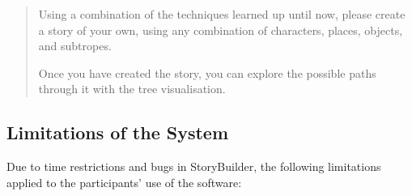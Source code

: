\documentclass[11pt]{report}
\begin{document}
\begin{framed}
\begin{quote}
Using a combination of the techniques learned up until now, please create a story of your own, using any combination of characters, places, objects, and subtropes.

Once you have created the story, you can explore the possible paths through it with the tree visualisation.
\end{quote}
\end{framed}

\subsection{Limitations of the System}
\label{sec:limitations}

Due to time restrictions and bugs in StoryBuilder, the following limitations
applied to the participants' use of the software:
\end{document}
